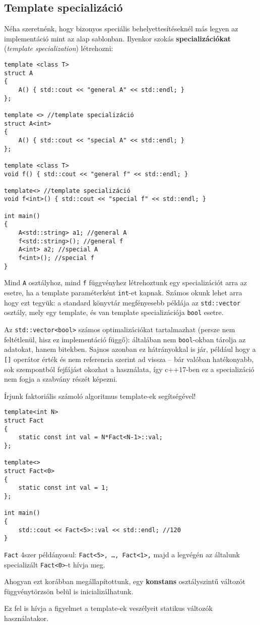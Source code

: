 \documentclass[a4paper,11.5pt,table]{article}
\begin{document}
	\subsection{Template specializáció}
	Néha szeretnénk, hogy bizonyos speciális behelyettesítéseknél más legyen az implementáció mint az alap sablonban. Ilyenkor szokás \textbf{specializációkat} (\textit{template specialization}) létrehozni:
	
	\begin{lstlisting}
template <class T>
struct A
{
	A()	{ std::cout << "general A" << std::endl; }
};

template <> //template specializáció
struct A<int>
{
	A() { std::cout << "special A" << std::endl; }
};

template <class T>
void f() { std::cout << "general f" << std::endl; }

template<> //template specializáció
void f<int>() { std::cout << "special f" << std::endl; }

int main() 
{
	A<std::string> a1; //general A
	f<std::string>(); //general f
	A<int> a2; //special A
	f<int>(); //special f
}
	\end{lstlisting}
	Mind \texttt{A} osztályhoz, mind \texttt{f} függvényhez létrehoztunk egy specializációt arra az esetre, ha a template paraméterként \texttt{int}-et kapnak. Számos okunk lehet arra hogy ezt tegyük: a standard könyvtár megfényesebb példája az \texttt{std::vector} osztály, mely egy template, és van template specializációja \texttt{bool} esetre.
	\begin{note}
		Az \texttt{std::vector<bool>} számos optimalizációkat tartalmazhat (persze nem feltétlenül, hisz ez implementáció függő): általában nem \texttt{bool}-okban tárolja az adatokat, hanem bitekben. Sajnos azonban ez hátrányokkal is jár, például hogy a \texttt{[]} operátor érték és nem referencia szerint ad vissza -- bár valóban hatékonyabb, sok szempontból fejfájást okozhat a használata, így c++17-ben ez a specializáció nem fogja a szabvány részét képezni.
	\end{note}
	Írjunk faktoriális számoló algoritmus template-ek segítségével!
	\begin{lstlisting}
template<int N>                           
struct Fact 
{                             
	static const int val = N*Fact<N-1>::val;
};

template<>                                
struct Fact<0>
{                          
	static const int val = 1;               
};               

int main() 
{                                          
	std::cout << Fact<5>::val << std::endl; //120
}
	\end{lstlisting}
	\texttt{Fact} 4szer példányosul: \texttt{Fact<5>, \ldots, Fact<1>,} majd a legvégén az általunk specializált \texttt{Fact<0>}-t hívja meg.
	\begin{note}
		Ahogyan ezt korábban megállapítottunk, egy \textbf{konstans} osztályszintű változót függvénytörzsön belül is inicializálhatunk.
	\end{note}
	Ez fel is hívja a figyelmet a template-ek veszélyeit statikus változók használatakor.
	
\end{document}
